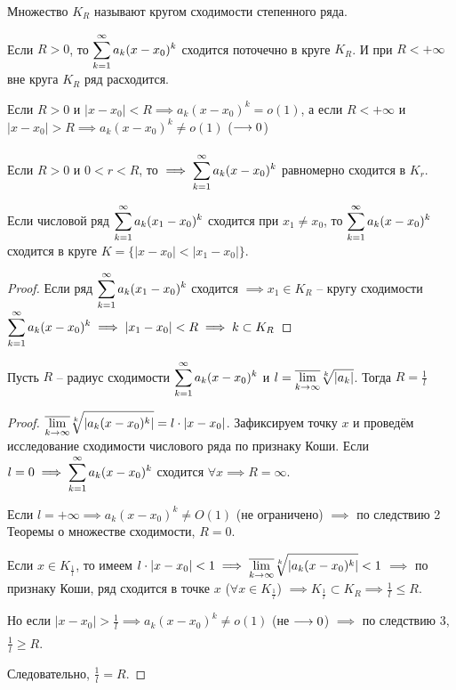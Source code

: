 \begin{definition}
    Множество $K_R$ называют кругом сходимости степенного ряда.
\end{definition}

\begin{corollary}
    Если $R > 0$, то $\displaystyle\sum_{k=1}^\infty a_k (x - x_0)^k$ сходится поточечно в круге $K_R$.
    И при $R < +\infty$ вне круга $K_R$ ряд расходится.
\end{corollary}

\begin{corollary}
    Если $R > 0$ и $|x - x_0| < R \implies a_k (x - x_0)^k = o(1)$, а
    если $R < +\infty$ и $|x - x_0| > R \implies a_k (x - x_0)^k \neq o(1)$
    ($\underset{}{\longrightarrow} 0$)
\end{corollary}

\begin{corollary}
    Если $R > 0$ и $0 < r < R$, то $\implies \displaystyle\sum_{k=1}^\infty a_k (x - x_0)^k$
    равномерно сходится в $K_r$.
\end{corollary}

\begin{theorem}[Абеля]
    Если числовой ряд $\displaystyle\sum_{k=1}^\infty a_k (x_1 - x_0)^k$ сходится при $x_1 \neq x_0$,
    то $\displaystyle\sum_{k=1}^\infty a_k (x - x_0)^k$ сходится в круге 
    $K = \{ |x - x_0| < |x_1 - x_0| \}$.
\end{theorem}
\begin{proof}
    Если ряд $\displaystyle\sum_{k=1}^\infty a_k (x_1 - x_0)^k$ сходится $\implies x_1 \in K_R$ --
    кругу сходимости 
    $\displaystyle\sum_{k=1}^\infty a_k (x - x_0)^k \implies |x_1 - x_0| < R \implies k \subset K_R$
\end{proof}

\begin{theorem}
    Пусть $R$ -- радиус сходимости $\displaystyle\sum_{k=1}^\infty a_k (x - x_0)^k$ и 
    $l = \displaystyle\overline{\lim_{k \to \infty}} \sqrt[k]{|a_k|}$.
    Тогда $R = \frac{1}{l}$
\end{theorem}
\begin{proof}
    $\displaystyle\overline{\lim_{k \to \infty}} \sqrt[k]{|a_k (x -x_0)^k|}
    = l \cdot |x - x_0|$. Зафиксируем точку $x$ и проведём исследование
    сходимости числового ряда по признаку Коши. Если $l = 0 \implies
    \displaystyle\sum_{k=1}^\infty a_k (x - x_0)^k$ сходится $\forall x \implies R = \infty$.

    Если $l = +\infty \implies a_k (x - x_0)^k \neq O(1)$ (не ограничено)
    $\implies$ по следствию 2 Теоремы о множестве сходимости, $R = 0$.

    Если $x \in K_{\frac{1}{l}}$, то имеем $l \cdot |x - x_0| < 1 \implies
    \displaystyle\overline{\lim_{k \to \infty}} \sqrt[k]{|a_k (x -x_0)^k|} < 1$
    $\implies$ по признаку Коши, ряд сходится в точке $x$
    ($\forall x \in K_{\frac{1}{l}}$) 
    $\implies K_{\frac{1}{l}} \subset K_R \implies \frac{1}{l} \leq R$.

    Но если $|x - x_0| > \frac{1}{l} \implies a_k (x - x_0)^k \neq o(1)$
    (не $\underset{}{\longrightarrow} 0$) $\implies$ по следствию 3, $\frac{1}{l} \geq R$.

    Следовательно, $\frac{1}{l} = R$.
\end{proof}

